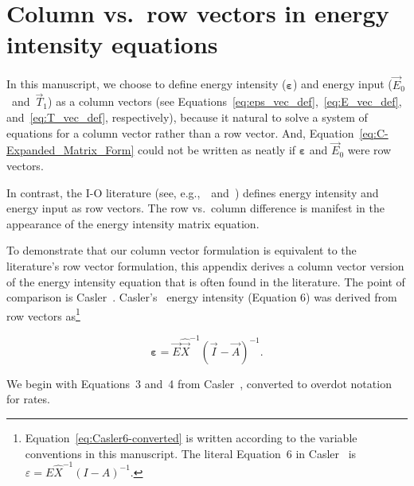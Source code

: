%
%
%
\chapter{Column vs.\ row vectors in energy intensity equations}
\label{chap:Casler} 


In this manuscript, we choose to define 
energy intensity ($\bm{\varepsilon}$) and 
energy input ($\vec{E}_{0}$~and~$\vec{T}_{1}$)
as a column vectors (see Equations~\ref{eq:eps_vec_def},~\ref{eq:E_vec_def}, 
and~\ref{eq:T_vec_def}, respectively),
because it natural to solve a system of equations
for a column vector rather than a row vector.
And, Equation~\ref{eq:C-Expanded_Matrix_Form} could not
be written as neatly if $\bm{\varepsilon}$ and $\vec{E}_{0}$
were row vectors.

In contrast, the I-O literature (see, 
e.g.,~\cite{Casler1984}~and~\cite{Bullard:1978vd})
defines energy intensity and energy input
as row vectors. 
The row vs.\ column difference is manifest in the appearance 
of the energy intensity matrix equation.

To demonstrate that our column vector formulation is equivalent 
to the literature's row vector formulation,
this appendix derives a column vector version of the energy intensity equation
that is often found in the literature.
The point of comparison is Casler~\cite{Casler1984}.
Casler's~\cite{Casler1984} energy intensity (Equation 6)
was derived from row vectors 
as\footnote{Equation~\ref{eq:Casler6-converted} is written according
to the variable conventions in this manuscript.
The literal Equation~6 in Casler~\cite{Casler1984} is
$
\varepsilon
= E \hat{X}^{-1} {(I - A)}^{-1}.
$
}

\begin{equation} \label{eq:Casler6-converted}
	\bm{\varepsilon}
	= \vec{E} 
		\hat{\vec{X}}^{-1}
		{(\vec{I} - \vec{A})}^{-1}.
\end{equation}

We begin with Equations~3 and~4 from Casler~\cite{Casler1984},
converted to overdot notation for rates.

